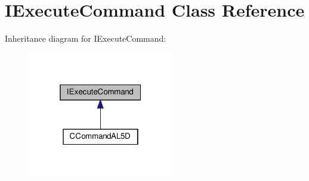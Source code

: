 \hypertarget{classIExecuteCommand}{}\section{I\+Execute\+Command Class Reference}
\label{classIExecuteCommand}


Inheritance diagram for I\+Execute\+Command\+:\nopagebreak
\begin{figure}[H]
\begin{center}
\leavevmode
\includegraphics[width=181pt]{classIExecuteCommand__inherit__graph}
\end{center}
\end{figure}
